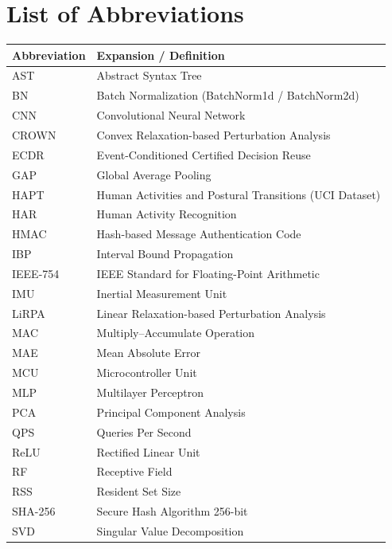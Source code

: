 \documentclass[11pt,oneside,a4paper]{report}
\newcommand{\code}[1]{{\small\upshape\ttfamily #1}}
\theoremstyle{remark}
\begin{document}
\chapter*{List of Abbreviations}
\begin{tabularx}{\textwidth}{@{}P{3.0cm}Y@{}}
\toprule
\textbf{Abbreviation} & \textbf{Expansion / Definition} \\
\midrule
AST & Abstract Syntax Tree \\
BN & Batch Normalization (\code{BatchNorm1d} / \code{BatchNorm2d}) \\
CNN & Convolutional Neural Network \\
CROWN & Convex Relaxation-based Perturbation Analysis \\
ECDR & Event-Conditioned Certified Decision Reuse \\
GAP & Global Average Pooling \\
HAPT & Human Activities and Postural Transitions (UCI Dataset) \\
HAR & Human Activity Recognition \\
HMAC & Hash-based Message Authentication Code \\
IBP & Interval Bound Propagation \\
IEEE-754 & IEEE Standard for Floating-Point Arithmetic \\
IMU & Inertial Measurement Unit \\
LiRPA & Linear Relaxation-based Perturbation Analysis \\
MAC & Multiply--Accumulate Operation \\
MAE & Mean Absolute Error \\
MCU & Microcontroller Unit \\
MLP & Multilayer Perceptron \\
PCA & Principal Component Analysis \\
QPS & Queries Per Second \\
ReLU & Rectified Linear Unit \\
RF & Receptive Field \\
RSS & Resident Set Size \\
SHA-256 & Secure Hash Algorithm 256-bit \\
SVD & Singular Value Decomposition \\
\bottomrule
\end{tabularx}

\clearpage
\tableofcontents
\clearpage
\listoffigures
\clearpage
\listoftables
\end{document}
